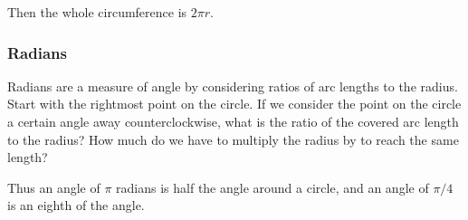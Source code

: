\documentclass[12pt]{article}
\begin{document}
Then the whole circumference is \( 2\pi r \).

\subsubsection{Radians}

Radians are a measure of angle by considering ratios of arc lengths to the radius.
Start with the rightmost point on the circle.
If we consider the point on the circle a certain angle away counterclockwise,
what is the ratio of the covered arc length to the radius?
How much do we have to multiply the radius by to reach the same length?

Thus an angle of \( \pi \) radians is half the angle around a circle,
and an angle of \( \pi/4 \) is an eighth of the angle.

\end{document}

